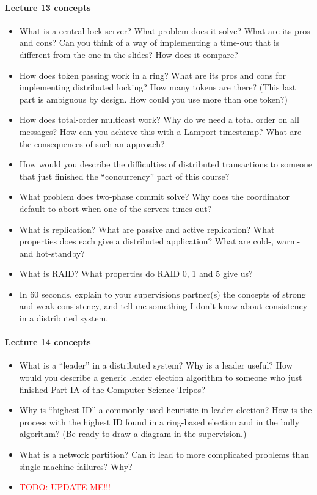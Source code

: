 \documentclass[12pt,a4paper,oneside,openright]{report}
\newcommand{\question}[2]{\paragraph{#1} #2}
\newcommand{\todo}[1]{\textcolor{red}{TODO: #1}}
\begin{document}
\question{Lecture 13 concepts}{
  \begin{itemize}
  \item What is a central lock server? What problem does it solve?
    What are its pros and cons? Can you think of a way of implementing
    a time-out that is different from the one in the slides? How does
    it compare?
  \item How does token passing work in a ring? What are its pros and
    cons for implementing distributed locking? How many tokens are
    there? (This last part is ambiguous by design. How could you use
    more than one token?)
  \item How does total-order multicast work? Why do we need a total
    order on all messages? How can you achieve this with a Lamport
    timestamp? What are the consequences of such an approach?
  \item How would you describe the difficulties of distributed
    transactions to someone that just finished the ``concurrency''
    part of this course?
  \item What problem does two-phase commit solve? Why does the
    coordinator default to abort when one of the servers times out?
  \item What is replication? What are passive and active replication?
    What properties does each give a distributed application? What are
    cold-, warm- and hot-standby?
  \item What is RAID? What properties do RAID 0, 1 and 5 give us?
  \item In 60 seconds, explain to your supervisions partner(s) the
    concepts of strong and weak consistency, and tell me something I
    don't know about consistency in a distributed system.
  \end{itemize}
}

\question{Lecture 14 concepts}{
  \begin{itemize}
  \item What is a ``leader'' in a distributed system? Why is a leader
    useful? How would you describe a generic leader election algorithm
    to someone who just finished Part IA of the Computer Science
    Tripos?
  \item Why is ``highest ID'' a commonly used heuristic in leader
    election? How is the process with the highest ID found in a
    ring-based election and in the bully algorithm? (Be ready to draw
    a diagram in the supervision.)
  \item What is a network partition? Can it lead to more complicated
    problems than single-machine failures? Why?
  \item \todo{UPDATE ME!!!}
  \end{itemize}
}
\end{document}
